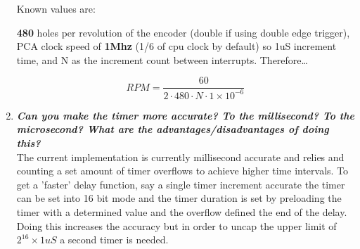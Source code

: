 \documentclass[11pt]{article}
\begin{document}
\begin{preview}
\begin{enumerate}
    Known values are: 

    \textbf{480} holes per revolution of the encoder (double if using double edge trigger), PCA clock speed of \textbf{1Mhz} (1/6 of cpu clock by default) so 1uS increment time, and N as the increment count between interrupts. Therefore\dots

    $$RPM = \frac{60}{2{\cdot}480{\cdot}N{\cdot}1{\times}10^{-6}}$$
        
    \item \textit{\textbf{Can you make the timer more accurate? To the millisecond? To the microsecond? What are the advantages/disadvantages of doing this?}}\\
    
    The current implementation is currently millisecond accurate and relies and counting a set amount of timer overflows to achieve higher time intervals. To get a 'faster' delay function, say a single timer increment accurate the timer can be set into 16 bit mode and the timer duration is set by preloading the timer with a determined value and the overflow defined the end of the delay. Doing this increases the accuracy but in order to uncap the upper limit of $2^16 \times 1uS$ a second timer is needed. 
\end{enumerate}
\end{preview}
\end{document}
